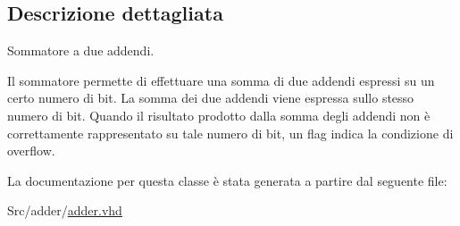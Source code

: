 \subsection{Descrizione dettagliata}
Sommatore a due addendi.

Il sommatore permette di effettuare una somma di due addendi espressi su un certo numero di bit. La somma dei due addendi viene espressa sullo stesso numero di bit. Quando il risultato prodotto dalla somma degli addendi non è correttamente rappresentato su tale numero di bit, un flag indica la condizione di overflow. 

La documentazione per questa classe è stata generata a partire dal seguente file\+:\begin{DoxyCompactItemize}
\item 
Src/adder/\hyperlink{adder_8vhd}{adder.\+vhd}\end{DoxyCompactItemize}
